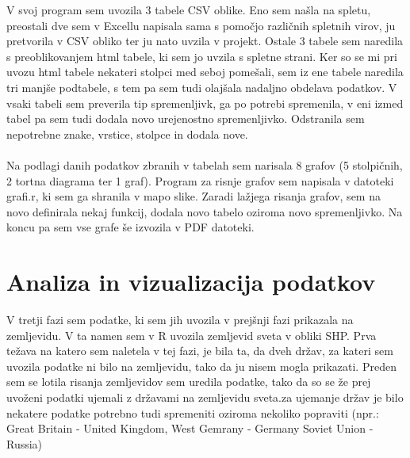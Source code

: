 \documentclass[11pt,a4paper]{article}
\begin{document}
V svoj program sem uvozila 3 tabele CSV oblike. Eno sem našla na spletu, preostali dve sem v Excellu napisala sama s pomočjo različnih spletnih virov, ju pretvorila v CSV obliko ter ju nato uvzila v projekt. Ostale 3 tabele sem naredila s preoblikovanjem html tabele, ki sem jo uvzila s spletne strani. Ker so se mi pri uvozu html tabele nekateri stolpci med seboj pomešali, sem iz ene tabele naredila tri manjše podtabele, s tem pa sem tudi olajšala nadaljno obdelava podatkov. V vsaki tabeli sem preverila tip spremenljivk, ga po potrebi spremenila, v eni izmed tabel pa sem tudi dodala novo urejenostno spremenljivko. Odstranila sem nepotrebne znake, vrstice, stolpce in dodala nove. \\
\\
Na podlagi danih podatkov zbranih v tabelah sem narisala 8 grafov (5 stolpičnih, 2 tortna diagrama ter 1 graf).
Program za risnje grafov sem napisala v datoteki grafi.r, ki sem ga shranila v mapo slike. Zaradi lažjega risanja grafov, sem na novo definirala nekaj funkcij, dodala novo tabelo oziroma novo spremenljivko.
Na koncu pa sem vse grafe še izvozila v PDF datoteki.



\newpage

\section{Analiza in vizualizacija podatkov}

V tretji fazi sem podatke, ki sem jih uvozila v prejšnji fazi prikazala na zemljevidu.
V ta namen sem v R uvozila zemljevid sveta v obliki SHP.
Prva težava na katero sem naletela v tej fazi, je bila ta, da dveh držav, za kateri sem uvozila podatke ni bilo na zemljevidu, tako da ju nisem mogla prikazati. 
Preden sem se lotila risanja zemljevidov sem uredila podatke, tako da so se že prej uvoženi podatki ujemali z državami na zemljevidu sveta.za ujemanje držav je bilo nekatere podatke potrebno tudi spremeniti oziroma nekoliko popraviti (npr.: Great Britain - United Kingdom, West Gemrany - Germany Soviet Union - Russia)\\
\\
\end{document}
